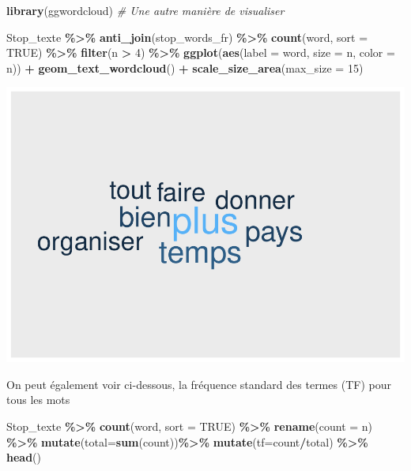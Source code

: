\documentclass[
]{article}
\newenvironment{Shaded}{\begin{snugshade}}{\end{snugshade}}
\newcommand{\AttributeTok}[1]{\textcolor[rgb]{0.13,0.29,0.53}{#1}}
\newcommand{\CommentTok}[1]{\textcolor[rgb]{0.56,0.35,0.01}{\textit{#1}}}
\newcommand{\ConstantTok}[1]{\textcolor[rgb]{0.56,0.35,0.01}{#1}}
\newcommand{\DecValTok}[1]{\textcolor[rgb]{0.00,0.00,0.81}{#1}}
\newcommand{\FunctionTok}[1]{\textcolor[rgb]{0.13,0.29,0.53}{\textbf{#1}}}
\newcommand{\NormalTok}[1]{#1}
\newcommand{\SpecialCharTok}[1]{\textcolor[rgb]{0.81,0.36,0.00}{\textbf{#1}}}
\begin{document}
\begin{Shaded}
\begin{Highlighting}[]
\FunctionTok{library}\NormalTok{(ggwordcloud) }\CommentTok{\# Une autre manière de visualiser}

\NormalTok{Stop\_texte }\SpecialCharTok{\%\textgreater{}\%}
  \FunctionTok{anti\_join}\NormalTok{(stop\_words\_fr) }\SpecialCharTok{\%\textgreater{}\%}
  \FunctionTok{count}\NormalTok{(word, }\AttributeTok{sort =} \ConstantTok{TRUE}\NormalTok{) }\SpecialCharTok{\%\textgreater{}\%}
  \FunctionTok{filter}\NormalTok{(n }\SpecialCharTok{\textgreater{}} \DecValTok{4}\NormalTok{) }\SpecialCharTok{\%\textgreater{}\%}
  \FunctionTok{ggplot}\NormalTok{(}\FunctionTok{aes}\NormalTok{(}\AttributeTok{label =}\NormalTok{ word, }\AttributeTok{size =}\NormalTok{ n, }\AttributeTok{color =}\NormalTok{ n)) }\SpecialCharTok{+} 
  \FunctionTok{geom\_text\_wordcloud}\NormalTok{() }\SpecialCharTok{+} 
  \FunctionTok{scale\_size\_area}\NormalTok{(}\AttributeTok{max\_size =} \DecValTok{15}\NormalTok{) }
\end{Highlighting}
\end{Shaded}

\includegraphics{Texte_mining_files/figure-latex/unnamed-chunk-10-1.pdf}

On peut également voir ci-dessous, la fréquence standard des termes (TF)
pour tous les mots

\begin{Shaded}
\begin{Highlighting}[]
\NormalTok{Stop\_texte }\SpecialCharTok{\%\textgreater{}\%}
  \FunctionTok{count}\NormalTok{(word, }\AttributeTok{sort =} \ConstantTok{TRUE}\NormalTok{) }\SpecialCharTok{\%\textgreater{}\%}
  \FunctionTok{rename}\NormalTok{(}\AttributeTok{count =}\NormalTok{ n) }\SpecialCharTok{\%\textgreater{}\%}
  \FunctionTok{mutate}\NormalTok{(}\AttributeTok{total=}\FunctionTok{sum}\NormalTok{(count))}\SpecialCharTok{\%\textgreater{}\%}
  \FunctionTok{mutate}\NormalTok{(}\AttributeTok{tf=}\NormalTok{count}\SpecialCharTok{/}\NormalTok{total) }\SpecialCharTok{\%\textgreater{}\%}
  \FunctionTok{head}\NormalTok{()}
\end{Highlighting}
\end{Shaded}
\end{document}
